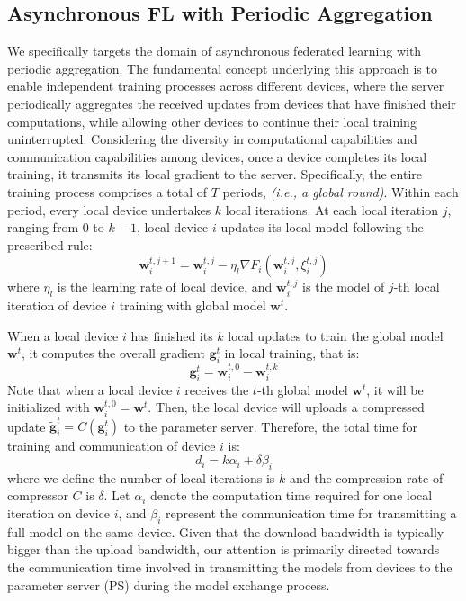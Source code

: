 \documentclass{article}
\begin{document}
\subsection{Asynchronous FL with Periodic Aggregation}\label{subsec:3.2AFL}
We specifically targets the domain of asynchronous federated learning with periodic aggregation. The fundamental concept underlying this approach is to enable independent training processes across different devices, where the server periodically aggregates the received updates from devices that have finished their computations, while allowing other devices to continue their local training uninterrupted. Considering the diversity in computational capabilities and communication capabilities among devices, once a device completes its local training, it transmits its local gradient to the server. Specifically, the entire training process comprises a total of $T$ periods, \textit{(i.e., a global round)}. Within each period, every local device undertakes $k$ local iterations. At each local iteration $j$, ranging from 0 to $k-1$, local device $i$ updates its local model following the prescribed rule:
\begin{equation}
    \mathbf{w}_i^{t, j+1} = \mathbf{w}_i^{t, j} - \eta_l \nabla F_i(\mathbf{w}_i^{t,j}, \xi_i^{t,j})
\end{equation}
where $\eta_l$ is the learning rate of local device, and $\mathbf{w}_i^{t, j}$ is the model of $j$-th local iteration of device $i$ training with global model $\mathbf{w}^t$.

When a local device $i$ has finished its $k$ local updates to train the global model $\mathbf{w}^t$, it computes the overall gradient $\mathbf{g}_i^t$ in local training, that is:
\begin{equation}
    \mathbf{g}_i^t = \mathbf{w}_i^{t, 0} - \mathbf{w}_i^{t, k}
\end{equation}
Note that when a local device $i$ receives the $t$-th global model $\mathbf{w}^t$, it will be initialized with $\mathbf{w}_i^{t, 0} = \mathbf{w}^t$. Then, the local device will uploads a compressed update $\tilde{\mathbf{g}}_i^t = C(\mathbf{g}_i^t)$ to the parameter server. Therefore, the total time for training and communication of device $i$ is:
\begin{equation}
\label{equ:device time}
    d_i = k\alpha_i + \delta\beta_i
\end{equation}
where we define the number of local iterations is $k$ and the compression rate of compressor $C$ is $\delta$. Let $\alpha_i$ denote the computation time required for one local iteration on device $i$, and $\beta_i$ represent the communication time for transmitting a full model on the same device. Given that the download bandwidth is typically bigger than the upload bandwidth\cite{uploadtime1,fedlamp}, our attention is primarily directed towards the communication time involved in transmitting the models from devices to the parameter server (PS) during the model exchange process.
 
\end{document}
